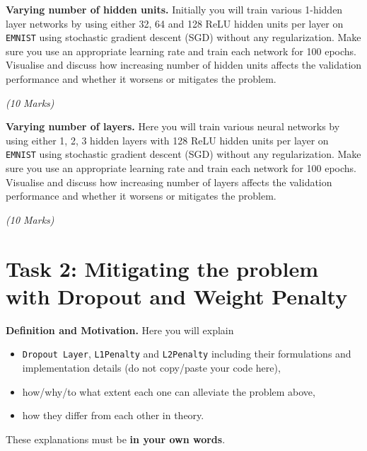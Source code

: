 \documentclass[11pt,]{article}
\begin{document}
\textbf{Varying number of hidden units.} Initially you will train various 1-hidden layer networks by using either 32, 64 and 128 ReLU hidden units per layer on \texttt{EMNIST} using stochastic gradient descent (SGD) without any regularization.
Make sure you use an appropriate learning rate and train each network for 100 epochs.
Visualise and discuss how increasing number of hidden units affects the validation performance and whether it worsens or mitigates the problem. 

\emph{(10 Marks)}

\textbf{Varying number of layers.} Here you will train various neural networks by using either 1, 2, 3 hidden layers with 128 ReLU hidden units per layer on \texttt{EMNIST} using stochastic gradient descent (SGD) without any regularization.
Make sure you use an appropriate learning rate and train each network for 100 epochs.
Visualise and discuss how increasing number of layers affects the validation performance and whether it worsens or mitigates the problem.

\emph{(10 Marks)}




\section{Task 2: Mitigating the problem with Dropout and Weight Penalty}
\label{sec:part2}

\textbf{Definition and Motivation. } Here you will explain 
\begin{itemize}
    \item \texttt{Dropout Layer}, \texttt{L1Penalty} and \texttt{L2Penalty} including their formulations and implementation details (do not copy/paste your code here),
    \item how/why/to what extent each one can alleviate the problem above,
    \item how they differ from each other in theory.
\end{itemize}
These explanations must be \textbf{in your own words}.
\end{document}
